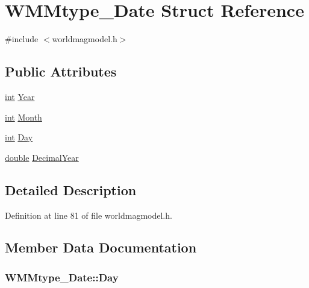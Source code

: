 \hypertarget{struct_w_m_mtype___date}{\section{W\-M\-Mtype\-\_\-\-Date Struct Reference}
\label{struct_w_m_mtype___date}
}


{\ttfamily \#include $<$worldmagmodel.\-h$>$}

\subsection*{Public Attributes}
\begin{DoxyCompactItemize}
\item 
\hyperlink{ioapi_8h_a787fa3cf048117ba7123753c1e74fcd6}{int} \hyperlink{struct_w_m_mtype___date_a6a93268d51911bf52e36f3096b1c263f}{Year}
\item 
\hyperlink{ioapi_8h_a787fa3cf048117ba7123753c1e74fcd6}{int} \hyperlink{struct_w_m_mtype___date_a8c47663c3abf7deaf85b9f7630d51738}{Month}
\item 
\hyperlink{ioapi_8h_a787fa3cf048117ba7123753c1e74fcd6}{int} \hyperlink{struct_w_m_mtype___date_aedcd09138d6c752ba3b58a30ade9dc6b}{Day}
\item 
\hyperlink{_super_l_u_support_8h_a8956b2b9f49bf918deed98379d159ca7}{double} \hyperlink{struct_w_m_mtype___date_a66b662f919345a2e81889ef080947ec1}{Decimal\-Year}
\end{DoxyCompactItemize}


\subsection{Detailed Description}


Definition at line 81 of file worldmagmodel.\-h.



\subsection{Member Data Documentation}
\hypertarget{struct_w_m_mtype___date_aedcd09138d6c752ba3b58a30ade9dc6b}{
\subsubsection[{Day}]{ W\-M\-Mtype\-\_\-\-Date\-::\-Day}}\label{struct_w_m_mtype___date_aedcd09138d6c752ba3b58a30ade9dc6b}



